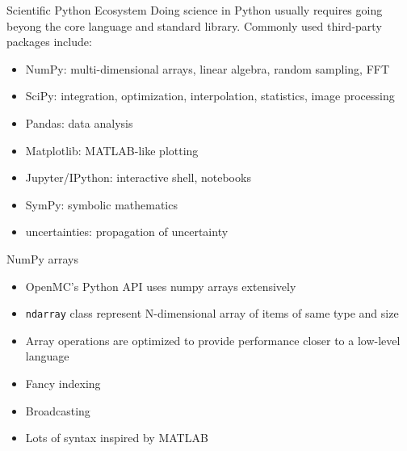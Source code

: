 \documentclass[noamssymb,svgnames]{beamer}
\newcommand{\obj}[1]{\texttt{\color{darkblue}#1}}
\begin{document}
\begin{frame}{Scientific Python Ecosystem}
  Doing science in Python usually requires going beyong the core language and
  standard library. Commonly used third-party packages include:
  \begin{itemize}
  \item NumPy: multi-dimensional arrays, linear algebra, random sampling, FFT
  \item SciPy: integration, optimization, interpolation, statistics, image
    processing
  \item Pandas: data analysis
  \item Matplotlib: MATLAB-like plotting
  \item Jupyter/IPython: interactive shell, notebooks
  \item SymPy: symbolic mathematics
  \item uncertainties: propagation of uncertainty
  \end{itemize}
\end{frame}

\begin{frame}{NumPy arrays}
  \begin{itemize}
  \item OpenMC's Python API uses numpy arrays extensively
  \item \obj{ndarray} class represent N-dimensional array of items of same
    type and size
  \item Array operations are optimized to provide performance closer to a
    low-level language
  \item Fancy indexing
  \item Broadcasting
  \item Lots of syntax inspired by MATLAB
  \end{itemize}
\end{frame}
\end{document}
